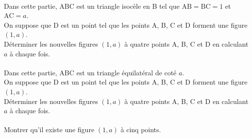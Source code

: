 \documentclass[a4paper,10pt,exos]{nsi}
\begin{document}
    {\titlefont\color{UGLiBlue}{Partie C}}\\
    Dans cette partie, ABC est un triangle isocèle en B tel que $\text{AB} = \text{BC} = 1$ et $\text{AC} = a$.\\
    On suppose que D est un point tel que les points A, B, C et D forment une figure $(1, a)$.\\[.5em]
    \question Déterminer les nouvelles figures $(1, a)$ à quatre points A, B, C et D en calculant $a$ à chaque fois.\\

    {\titlefont\color{UGLiBlue}{Partie D}}\\
    Dans cette partie, ABC est un triangle équilatéral de coté $a$.\\
    On suppose que D est un point tel que les points A, B, C et D forment une figure $(1, a)$.\\[.5em]
    \question Déterminer les nouvelles figures $(1, a)$ à quatre points A, B, C et D en calculant $a$ à chaque fois.\\

    {\titlefont\color{UGLiBlue}{Partie E}}\\
    \question Montrer qu’il existe une figure $(1, a)$ à cinq points.
\end{document}
